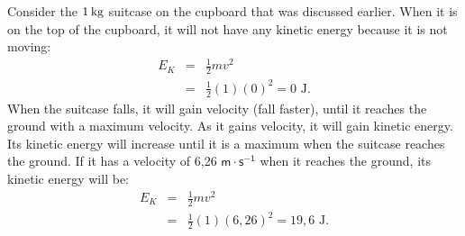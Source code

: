       \label{m38785*id66902}Consider the $1\phantom{\rule{2pt}{0ex}}\text{kg}$ suitcase on the cupboard that was discussed earlier.
When it is on the top of the cupboard, it will not have any kinetic energy because it is not moving:
\begin{eqnarray*}
E_{K} &=& \frac{1}{2}mv^{2} \\
& = & \frac{1}{2}(1)(0)^{2} = 0 \text{ J}.
\end{eqnarray*}
When the suitcase falls, it will gain velocity (fall faster), until it reaches the ground with a maximum velocity.  
As it gains velocity, it will gain kinetic energy. 
Its kinetic energy will increase until it is a maximum when the suitcase reaches the ground.
If it has a velocity of 6,26 $\mathsf{m \cdot s^{-1}}$ when it reaches the ground, its kinetic energy will be:
\begin{eqnarray*}
E_{K} &=& \frac{1}{2}mv^{2} \\
& = & \frac{1}{2}(1)(6,26)^{2} = 19,6 \text{ J}.
\end{eqnarray*}

